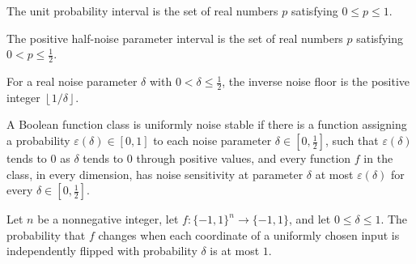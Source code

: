 \begin{definition}
\label{FABL.UnitProbability}
\leanok
The unit probability interval is the set of real numbers $p$ satisfying $0 \le p \le 1$.
\end{definition}

\begin{definition}
\label{FABL.PositiveHalfNoiseParameter}
\leanok
The positive half-noise parameter interval is the set of real numbers $p$ satisfying $0
< p \le \tfrac12$.
\end{definition}

\begin{definition}
\label{FABL.inverseNoiseFloor}
\leanok
{}
For a real noise parameter $\delta$ with $0<\delta\le\tfrac12$, the inverse noise floor
is the positive integer $\left\lfloor 1/\delta\right\rfloor$.
\end{definition}

\begin{definition}
\label{FABL.IsUniformlyNoiseStable}
\leanok
{}
A Boolean function class is uniformly noise stable if there is a function assigning a
probability $\varepsilon(\delta)\in[0,1]$ to each noise parameter
$\delta\in[0,\tfrac12]$, such that $\varepsilon(\delta)$ tends to $0$ as $\delta$ tends
to $0$ through positive values, and every function $f$ in the class, in every dimension,
has noise sensitivity at parameter $\delta$ at most $\varepsilon(\delta)$ for every
$\delta\in[0,\tfrac12]$.
\end{definition}

\begin{theorem}
\label{FABL.noiseSensitivity_le_one}
\leanok
{}
Let $n$ be a nonnegative integer, let $f:\{-1,1\}^n\to\{-1,1\}$, and let
$0\leq\delta\leq1$. The probability that $f$ changes when each coordinate of a uniformly
chosen input is independently flipped with probability $\delta$ is at most $1$.
\end{theorem}

